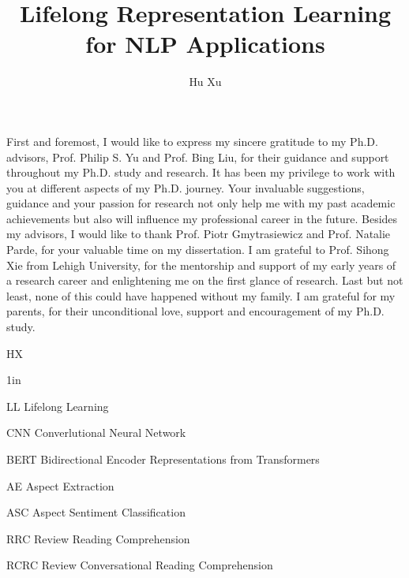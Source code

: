 \documentclass{uicthesi}
\begin{document}
\title{Lifelong Representation Learning for NLP Applications}
\author{Hu Xu}
\pdegrees{}
\maketitle


\acknowledgements
{First and foremost, I would like to express my sincere gratitude to my Ph.D. advisors, Prof. Philip
S. Yu and Prof. Bing Liu, for their guidance and support throughout my Ph.D. study and research. It has been my privilege
to work with you at different aspects of my Ph.D. journey. Your invaluable suggestions, guidance and
your passion for research not only help me with my past academic achievements but also will influence
my professional career in the future.
Besides my advisors, I would like to thank 
Prof. Piotr Gmytrasiewicz and Prof. Natalie Parde, for your valuable time on my dissertation.
I am grateful to Prof. Sihong Xie from Lehigh University, for the mentorship and support of my early years of a research career and enlightening me on the first glance of research. 
Last but not least, none of this could have happened without my family. I am grateful for my parents, for their unconditional love, support and encouragement of my Ph.D. study.\\

\begin{flushright}HX\end{flushright}}

\tableofcontents
\listoftables
\listoffigures
\listofabbreviations
\begin{list}
{}
{\setlength
  {}{1in}
    \setlength{\leftmargin}{1.5in}
    \setlength{\labelsep}{.5in}
    \setlength{\rightmargin}{\leftmargin}}
\item[LL\hfill] Lifelong Learning
\item[CNN\hfill] Converlutional Neural Network
\item[BERT\hfill] Bidirectional Encoder Representations from Transformers
\item[AE\hfill] Aspect Extraction
\item[ASC\hfill] Aspect Sentiment Classification
\item[RRC\hfill] Review Reading Comprehension
\item[RCRC\hfill] Review Conversational Reading Comprehension
\end{list}
\end{document}
